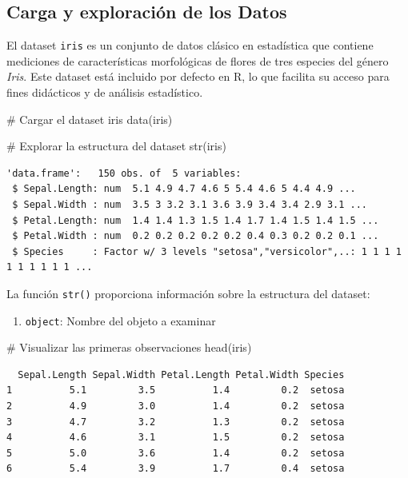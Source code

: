 \documentclass[
  spanish,
  letterpaper,
]{book}
\newenvironment{Shaded}{\begin{snugshade}}{\end{snugshade}}
\newcommand{\CommentTok}[1]{\textcolor[rgb]{0.37,0.37,0.37}{#1}}
\newcommand{\FunctionTok}[1]{\textcolor[rgb]{0.28,0.35,0.67}{#1}}
\newcommand{\NormalTok}[1]{\textcolor[rgb]{0.00,0.23,0.31}{#1}}
\providecommand{\tightlist}{%
  \setlength{\itemsep}{0pt}\setlength{\parskip}{0pt}}
\begin{document}
\subsection{Carga y exploración de los
Datos}\label{carga-y-exploraciuxf3n-de-los-datos}

El dataset \texttt{iris} es un conjunto de datos clásico en estadística
que contiene mediciones de características morfológicas de flores de
tres especies del género \emph{Iris}. Este dataset está incluido por
defecto en R, lo que facilita su acceso para fines didácticos y de
análisis estadístico.

\begin{Shaded}
\begin{Highlighting}[]
\CommentTok{\# Cargar el dataset iris}
\FunctionTok{data}\NormalTok{(iris)}

\CommentTok{\# Explorar la estructura del dataset}
\FunctionTok{str}\NormalTok{(iris)}
\end{Highlighting}
\end{Shaded}

\begin{verbatim}
'data.frame':   150 obs. of  5 variables:
 $ Sepal.Length: num  5.1 4.9 4.7 4.6 5 5.4 4.6 5 4.4 4.9 ...
 $ Sepal.Width : num  3.5 3 3.2 3.1 3.6 3.9 3.4 3.4 2.9 3.1 ...
 $ Petal.Length: num  1.4 1.4 1.3 1.5 1.4 1.7 1.4 1.5 1.4 1.5 ...
 $ Petal.Width : num  0.2 0.2 0.2 0.2 0.2 0.4 0.3 0.2 0.2 0.1 ...
 $ Species     : Factor w/ 3 levels "setosa","versicolor",..: 1 1 1 1 1 1 1 1 1 1 ...
\end{verbatim}

La función \texttt{str()} proporciona información sobre la estructura
del dataset:

\begin{enumerate}
\def\labelenumi{\arabic{enumi}.}
\tightlist
\item
  \texttt{object}: Nombre del objeto a examinar
\end{enumerate}

\begin{Shaded}
\begin{Highlighting}[]
\CommentTok{\# Visualizar las primeras observaciones}
\FunctionTok{head}\NormalTok{(iris)}
\end{Highlighting}
\end{Shaded}

\begin{verbatim}
  Sepal.Length Sepal.Width Petal.Length Petal.Width Species
1          5.1         3.5          1.4         0.2  setosa
2          4.9         3.0          1.4         0.2  setosa
3          4.7         3.2          1.3         0.2  setosa
4          4.6         3.1          1.5         0.2  setosa
5          5.0         3.6          1.4         0.2  setosa
6          5.4         3.9          1.7         0.4  setosa
\end{verbatim}
\end{document}

